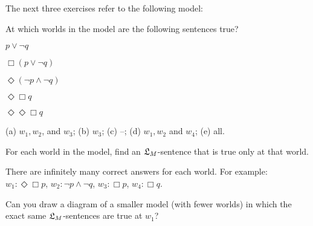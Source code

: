 The next three exercises refer to the following model:
%
\begin{center}
\end{center}

\begin{exercise}
  At which worlds in the  model are the following sentences true?
  \begin{exlist}
  \item $p \lor \neg q$
  \item $\Box(p \lor \neg q)$
  \item $\Diamond(\neg p \land \neg q)$
  \item $\Diamond\Box q$
  \item $\Diamond\Diamond\Box q$
  \end{exlist}
\end{exercise}
\begin{solution}
  (a) $w_{1}, w_{2}$, and $w_{3}$; (b) $w_{3}$; (c) --; (d) $w_{1}, w_{2}$ and $w_{4}$; (e) all.
\end{solution}

\begin{exercise}
  For each world in the model, find an $\mathfrak{L}_M$-sentence that is true only at
  that world.
\end{exercise}
\begin{solution}
  There are infinitely many correct answers for each world. For
  example: $w_1: \Diamond\Box p$, $w_2: \neg p \land \neg q$,
  $w_3: \Box p$, $w_4: \Box q$.
\end{solution}

\begin{exercise}
  Can you draw a diagram of a smaller model (with fewer worlds) in
  which the exact same $\mathfrak{L}_M$-sentences are true at $w_1$?
\end{exercise}
\begin{solution}
\end{solution}

